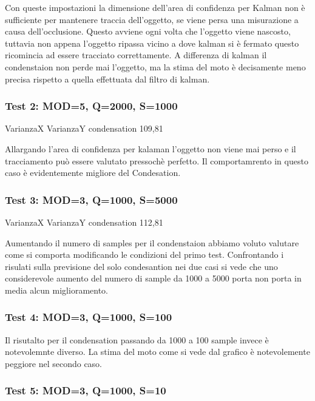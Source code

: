 Con queste impostazioni la dimensione dell'area di confidenza per Kalman non è sufficiente per mantenere traccia dell'oggetto, se viene persa una misurazione a causa dell'occlusione. Questo avviene ogni volta che l'oggetto viene nascosto, tuttavia non appena l'oggetto ripassa vicino a dove kalman si è fermato questo ricomincia ad essere tracciato correttamente. A differenza di kalman il condenstaion non perde mai l'oggetto, ma la stima del moto è decisamente meno precisa rispetto a quella effettuata dal filtro di kalman.

\newpage

\subsubsection{Test 2: MOD=5, Q=2000, S=1000}

VarianzaX VarianzaY condensation
109,81

Allargando l'area di confidenza per kalaman l'oggetto non viene mai perso e il tracciamento può essere valutato pressochè perfetto. Il comportamrento in questo caso è evidentemente migliore del Condesation.



\subsubsection{Test 3: MOD=3, Q=1000, S=5000}

VarianzaX VarianzaY condensation
112,81

Aumentando il numero di samples per il condenstaion abbiamo voluto valutare come  si comporta modificando le condizioni del primo test. Confrontando i risulati sulla previsione del solo condesantion nei due casi si vede che uno considerevole aumento del numero di sample da 1000 a 5000 porta non porta in media alcun miglioramento.


\subsubsection{Test 4: MOD=3, Q=1000, S=100}

Il risutalto  per il condensation passando da 1000 a 100 sample invece è notevolemnte diverso. La stima del moto come si vede dal grafico è notevolemente peggiore nel secondo caso.


\subsubsection{Test 5: MOD=3, Q=1000, S=10}

